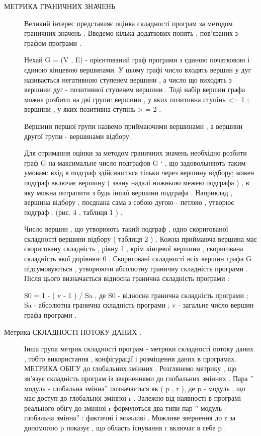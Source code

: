\begin{description}
\item[{МЕТРИКА ГРАНИЧНИХ ЗНАЧЕНЬ}] \leavevmode
Великий інтерес представляє оцінка складності програм за методом граничних значень .
Введемо кілька додаткових понять , пов'язаних з графом програми .

Нехай G = (V , E) - орієнтований граф програми з єдиною початковою і єдиною кінцевою вершинами. У цьому графі число входять вершин у дуг називається негативною ступенем вершини , а число що виходять з вершини дуг - позитивної ступенем вершини . Тоді набір вершин графа можна розбити на дві групи: вершини , у яких позитивна ступінь \textless{}= 1 ; вершини , у яких позитивна ступінь \textgreater{} = 2 .

Вершини першої групи назвемо приймаючими вершинами , а вершини другої групи - вершинами відбору.

Для отримання оцінки за методом граничних значень необхідно розбити граф G на максимальне число подграфов G ` , що задовольняють таким умовам: вхід в подграф здійснюється тільки через вершину відбору; кожен подграф включає вершину ( звану надалі нижньою межею подграфа ) , в яку можна потрапити з будь іншої вершини подграфа . Наприклад , вершина відбору , поєднана сама з собою дугою - петлею , утворює подграф . (рис. 4 , таблиця 1 ) .

Число вершин , що утворюють такий подграф , одно скоригованої складності вершини відбору ( таблиця 2 ) . Кожна приймаюча вершина має скориговану складність , рівну 1 , крім кінцевої вершини , скоригована складність якої дорівнює 0 . Скориговані складності всіх вершин графа G підсумовуються , утворюючи абсолютну граничну складність програми . Після цього визначається відносна гранична складність програми :

S0 = 1 - ( v - 1 ) / Sa ,
де S0 - відносна гранична складність програми ; Sa - абсолютна гранична складність програми ; v - загальне число вершин графа програми .

\item[{Метрика СКЛАДНОСТІ ПОТОКУ ДАНИХ .}] \leavevmode
Інша група метрик складності програм - метрики складності потоку даних , тобто використання , конфігурації і розміщення даних в програмах.
МЕТРИКА ОБІГУ до глобальних змінних .
Розглянемо метрику , що зв'язує складність програм із зверненнями до глобальних змінних .
Пара '' модуль - глобальна змінна'' позначається як ( p , r ), де p - модуль , що має доступ до глобальної змінної r . Залежно від наявності в програмі реального обігу до змінної r формуються два типи пар '' модуль - глобальна змінна'' : фактичні і можливі . Можливе звернення до r за допомогою p показує , що область існування r включає в себе p .


\end{description}
